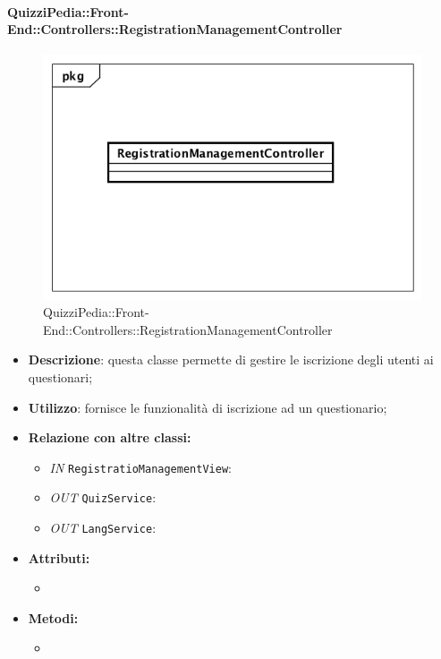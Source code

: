\paragraph{QuizziPedia::Front-End::Controllers::RegistrationManagementController}
\begin{figure}
	\centering
	\includegraphics[scale=0.45]{UML/Classi/Front-End/QuizziPedia_Front-end_Controller_RegistrationManagementController.png}
	\caption{QuizziPedia::Front-End::Controllers::RegistrationManagementController}
\end{figure}
\begin{itemize}
	\item \textbf{Descrizione}: questa classe permette di gestire le iscrizione degli utenti ai questionari;
	\item \textbf{Utilizzo}: fornisce le funzionalità di iscrizione ad un questionario;
	\item \textbf{Relazione con altre classi:}
	\begin{itemize}
		\item \textit{IN} \texttt{RegistratioManagementView}: 
		\item \textit{OUT} \texttt{QuizService}: 
		\item \textit{OUT} \texttt{LangService}: 
	\end{itemize}
	\item \textbf{Attributi:}
	\begin{itemize}
		\item 
	\end{itemize}
	\item \textbf{Metodi:}
	\begin{itemize}
		\item 
	\end{itemize}
\end{itemize}

